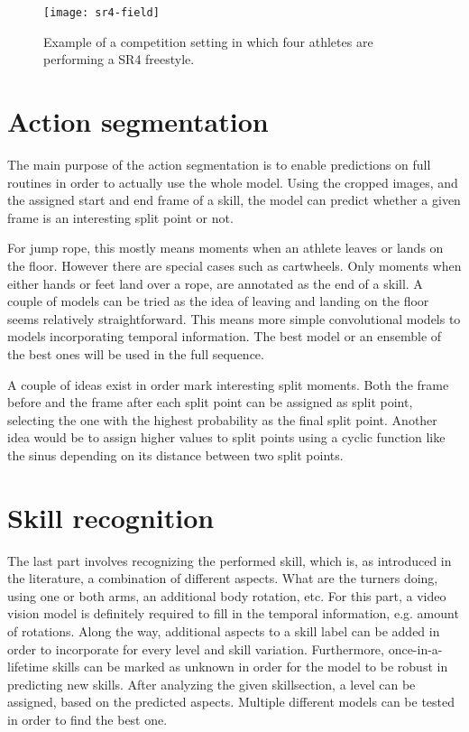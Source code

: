 \begin{figure}
    \centering
    \texttt{[image: sr4-field]}
    \caption[Example jump rope competition setting]{Example of a competition setting in which four athletes are performing a SR4 freestyle.}
    \label{fig:sr4-field}
\end{figure}


\section{Action segmentation}
\label{methodology:action-segmentation}

The main purpose of the action segmentation is to enable predictions on full routines in order to actually use the whole model. Using the cropped images, and the assigned start and end frame of a skill, the model can predict whether a given frame is an interesting split point or not.

For jump rope, this mostly means moments when an athlete leaves or lands on the floor. However there are special cases such as cartwheels. Only moments when either hands or feet land over a rope, are annotated as the end of a skill. A couple of models can be tried as the idea of leaving and landing on the floor seems relatively straightforward. This means more simple convolutional models to models incorporating temporal information.
The best model or an ensemble of the best ones will be used in the full sequence.

A couple of ideas exist in order mark interesting split moments. Both the frame before and the frame after each split point can be assigned as split point, selecting the one with the highest probability as the final split point. Another idea would be to assign higher values to split points using a cyclic function like the sinus depending on its distance between two split points.

\section{Skill recognition}
\label{methodology:skill-recogntion}

The last part involves recognizing the performed skill, which is, as introduced in the literature, a combination of different aspects. What are the turners doing, using one or both arms, an additional body rotation, etc.
For this part, a video vision model is definitely required to fill in the temporal information, e.g. amount of rotations.
Along the way, additional aspects to a skill label can be added in order to incorporate for every level and skill variation.
Furthermore, once-in-a-lifetime skills can be marked as unknown in order for the model to be robust in predicting new skills. After analyzing the given skillsection, a level can be assigned, based on the predicted aspects.
Multiple different models can be tested in order to find the best one.


